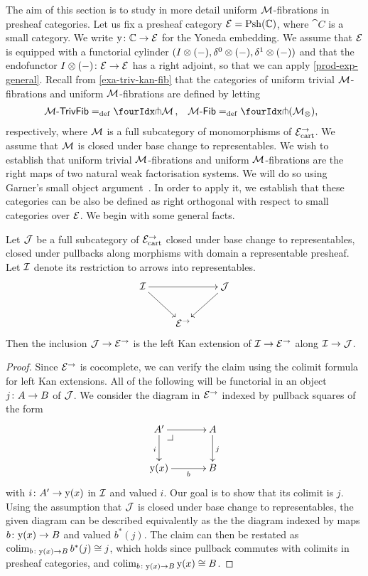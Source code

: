 \documentclass[reqno,10pt,a4paper,oneside,draft]{amsart}
\begin{document}
The aim of this section is to study in more detail uniform $\cal{M}$-fibrations in presheaf categories.
Let us fix a presheaf category $\catE = \Psh(\cat{C})$, where $\cat{C}$ is a small category.
We write $\yon \co \catC \to \catE$ for the Yoneda embedding.
We assume that $\catE$ is equipped with a functorial cylinder $( \interval \otimes (-), \lcyl \otimes (-), \rcyl \otimes (-))$ and that the endofunctor $ \interval\otimes (-) \co \catE \to \catE$ has a right adjoint, so that we can apply \cref{prod-exp-general}.
Recall from \cref{exa-triv-kan-fib} that the categories of uniform trivial $\cal{M}$-fibrations and uniform $\cal{M}$-fibrations are defined by letting
\[
\begin{aligned}
  \TrivFib{\cal{M}} &\defeq \liftr{\cal{M}}
\, ,&
  \Fib{\cal{M}} &\defeq \liftr{(\cal{M}_\otimes)}
\rlap{,}
\end{aligned}
\]
respectively, where $\cal{M}$ is a full subcategory of monomorphisms of $\catE_\cart^\to$.
We assume that $\cal{M}$ is closed under base change to representables.
We wish to establish that uniform trivial $\cal{M}$-fibrations and uniform $\cal{M}$-fibrations are the right maps of two natural weak factorisation systems.
We will do so using Garner's small object argument~\cite{garner:small-object-argument}.
In order to apply it, we establish that these categories can be also be defined as right orthogonal with respect to small categories over $\catE$.
We begin with some general facts.

\begin{lemma} \label{left-kan-extension-of-representables}
Let $\cal{J}$ be a full subcategory of $\catE_{\cart}^\to$ closed under base change to representables, \ie closed under pullbacks along morphisms with domain a representable presheaf.
Let $\cal{I}$ denote its restriction to arrows into representables.
\[
\xymatrix{
  \cal{I}
  \ar[rr]
  \ar[dr]
&&
  \cal{J}
  \ar[dl]
\\&
  \catE^\to
}
\]
Then the inclusion $\cal{J} \to \catE^\to$ is the left Kan extension of $\cal{I} \to \catE^\to$ along $\cal{I} \to \cal{J}$.
\end{lemma}

\begin{proof}
Since $\catE^\to$ is cocomplete, we can verify the claim using the colimit formula for left Kan extensions.
All of the following will be functorial in an object $j \co A \to B$ of $\cal{J}$.
We consider the diagram in $\catE^\to$ indexed by pullback squares of the form
\[
\xymatrix@C=1.2cm{
  A'
  \ar[r]
  \ar[d]_{i}
  \pullback{dr}
&
  A
  \ar[d]^{j}
\\
  \yon(x)
  \ar[r]_-{b}
&
  B
}
\]
with $i \co A' \to \yon(x)$ in $\cal{I}$ and valued $i$.
Our goal is to show that its colimit is $j$.
Using the assumption that $\cal{J}$ is closed under base change to representables, the given diagram can be described equivalently as the the diagram indexed by maps $b \co \yon(x) \to B$ and valued $b^*(j)$.
The claim can then be restated as $\colim_{b \co \yon(x) \to B} b^*(j) \iso j$, which holds since pullback commutes with colimits in presheaf categories, and $\colim_{b \co \yon(x) \to B} \yon(x) \iso B$.
\end{proof}
\end{document}
